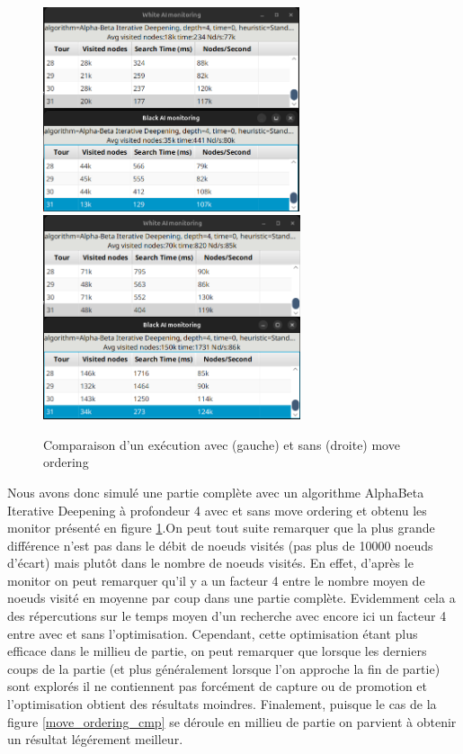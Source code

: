 \documentclass{article}
\begin{document}
\begin{figure}[h]
    \centering
    \includegraphics[width=\textwidth,height=6.0cm,keepaspectratio]{with_mo.png}
    \includegraphics[width=\textwidth,height=6.0cm,keepaspectratio]{without_mo.png}
    \caption{Comparaison d'un exécution avec (gauche) et sans (droite) move ordering}
    \label{move_ordering_cmp_monitor}
\end{figure}
\FloatBarrier

Nous avons donc simulé une partie complète avec un algorithme AlphaBeta Iterative Deepening à profondeur 4 avec et sans move ordering et obtenu les monitor
présenté en figure \ref{move_ordering_cmp_monitor}.On peut tout suite remarquer que la plus grande différence n'est pas dans le débit de noeuds visités (pas plus de 10000 noeuds d'écart) mais plutôt dans le nombre de noeuds visités.
En effet, d'après le monitor on peut remarquer qu'il y a un facteur 4 entre le nombre moyen de noeuds visité en moyenne par coup dans une partie complète. Evidemment cela a des répercutions
sur le temps moyen d'un recherche avec encore ici un facteur 4 entre avec et sans l'optimisation. Cependant, cette optimisation étant plus efficace dans le millieu de partie, on peut remarquer
que lorsque les derniers coups de la partie (et plus généralement lorsque l'on approche la fin de partie) sont explorés il ne contiennent pas forcément de capture ou de promotion et l'optimisation
obtient des résultats moindres. Finalement, puisque le cas de la figure \ref{move_ordering_cmp} se déroule en millieu de partie on parvient à obtenir un résultat légérement meilleur.
\end{document}
